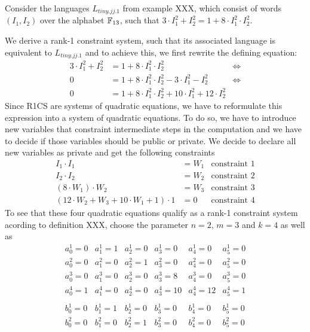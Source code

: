 \begin{example} Consider the languages $L_{tiny.jj.1}$ from example XXX, which consist of words $(I_1,I_2)$ over the alphabet $\mathbb{F}_{13}$, such that $3\cdot I_1^2 + I_2^2 = 1 + 8\cdot I_1^2\cdot I_2^2$. 

We derive a rank-1 constraint system, such that its associated language is equivalent to $L_{tiny.jj.1}$ and to achieve this, we first rewrite the defining equation:
\begin{align*}
3\cdot I_1^2 + I_2^2  & = 1 + 8\cdot I_1^2\cdot I_2^2 & \Leftrightarrow \\
 0 & = 1 + 8\cdot I_1^2\cdot I_2^2 - 3\cdot I_1^2 - I_2^2  & \Leftrightarrow \\
 0 & = 1 + 8\cdot I_1^2\cdot I_2^2 + 10\cdot I_1^2 +12\cdot I_2^2
\end{align*}
Since R1CS are systems of quadratic equations, we have to reformulate this expression into a system of quadratic equations. To do so, we have to introduce new variables that constraint intermediate steps in the computation and we have to decide if those variables should be public or private. We decide to declare all new variables as private and get the following constraints
\begin{align*}
I_1 \cdot I_1 & = W_1 & \text{constraint } 1\\
I_2 \cdot I_2 & = W_2 & \text{constraint } 2\\
(8 \cdot W_1) \cdot W_2 & = W_3 & \text{constraint } 3\\
(12\cdot W_2 + W_3 + 10\cdot W_1 + 1)\cdot 1 & = 0 & \text{constraint } 4
\end{align*}
To see that these four quadratic equations qualify as a rank-1 constraint system acording to definition XXX, choose the parameter $n=2$, $m=3$ and $k=4$ as well as
$$
\begin{array}{llllll}
a_0^1 = 0 & a_1^1= 1 & a_2^1= 0 & a_3^1 = 0 & a_4^1= 0  & a_5^1= 0 \\ 
a_0^2 = 0 & a_1^2= 0 & a_2^2= 1 & a_3^2 = 0 & a_4^2= 0  & a_5^2= 0 \\ 
a_0^3 = 0 & a_1^3= 0 & a_2^3= 0 & a_3^3 = 8 & a_4^3= 0  & a_5^3= 0 \\ 
a_0^4 = 1 & a_1^4= 0 & a_2^4= 0 & a_3^4 = 10 & a_4^4= 12  & a_5^4= 1 \\ 
\\
b_0^1 = 0 & b_1^1= 1 & b_2^1= 0 & b_3^1 = 0 & b_4^1= 0  & b_5^1= 0 \\ 
b_0^2 = 0 & b_1^2= 0 & b_2^2= 1 & b_3^2 = 0 & b_4^2= 0  & b_5^2= 0 \\ 

\end{array}$$
\end{example}

